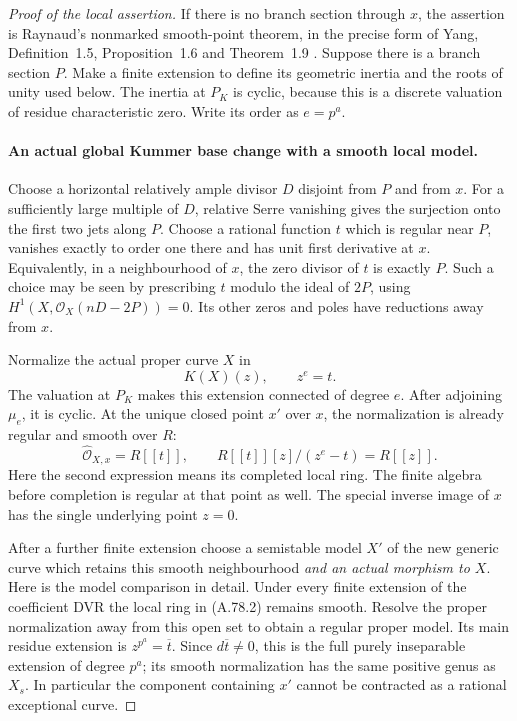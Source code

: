 \begin{proof}[Proof of the local assertion]
If there is no branch section through \(x\), the assertion is
Raynaud's nonmarked smooth-point theorem, in the precise form
of Yang, Definition~1.5, Proposition~1.6 and Theorem~1.9
\cite{fghYang2024}. Suppose there is a branch section \(P\).
Make a finite extension to define its geometric inertia and
the roots of unity used below. The inertia at \(P_K\) is
cyclic, because this is a discrete valuation of residue
characteristic zero. Write its order as \(e=p^a\).

\paragraph{An actual global Kummer base change with a smooth local model.}
Choose a horizontal relatively ample divisor \(D\) disjoint
from \(P\) and from \(x\). For a sufficiently large multiple
of \(D\), relative Serre vanishing gives the surjection onto
the first two jets along \(P\). Choose a rational function
\(t\) which is regular near \(P\), vanishes exactly to
order one there and has unit first derivative at \(x\).
Equivalently, in a neighbourhood of \(x\), the zero divisor
of \(t\) is exactly \(P\). Such a choice may be seen by
prescribing \(t\) modulo the ideal of \(2P\), using
\(H^1(X,\mathcal O_X(nD-2P))=0\). Its other zeros and
poles have reductions away from \(x\).

Normalize the actual proper curve \(X\) in
\[
                    K(X)(z),\qquad z^e=t.                 \tag{A.78.1}
\]
The valuation at \(P_K\) makes this extension connected
of degree \(e\). After adjoining \(\mu_e\), it is cyclic.
At the unique closed point \(x'\) over \(x\), the
normalization is already regular and smooth over \(R\):
\[
 \widehat{\mathcal O}_{X,x}=R[[t]],\qquad
 R[[t]][z]/(z^e-t)=R[[z]].                               \tag{A.78.2}
\]
Here the second expression means its completed local ring.
The finite algebra before completion is regular at that
point as well. The special inverse image of \(x\) has
the single underlying point \(z=0\).

After a further finite extension choose a semistable model
\(X'\) of the new generic curve which retains this smooth
neighbourhood \emph{and an actual morphism to \(X\)}.
Here is the model comparison in detail. Under every finite
extension of the coefficient DVR the local ring in (A.78.2)
remains smooth. Resolve the proper normalization away from
this open set to obtain a regular proper model. Its main
residue extension is
\(z^{p^a}=\overline t\). Since \(d\overline t\ne0\),
this is the full purely inseparable extension of degree
\(p^a\); its smooth normalization has the same positive
genus as \(X_s\). In particular the component containing
\(x'\) cannot be contracted as a rational exceptional curve.


\end{proof}
